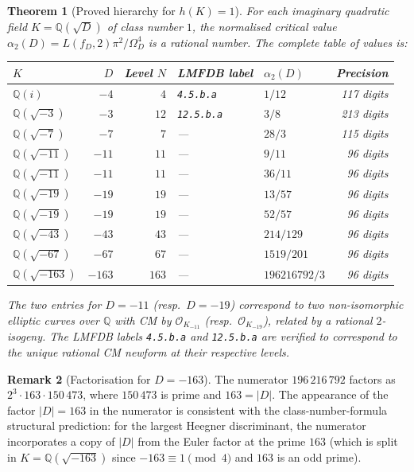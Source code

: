 \documentclass[12pt]{amsart}
\newtheorem{theorem}{Theorem}[section]
\theoremstyle{definition}
\newtheorem{remark}[theorem]{Remark}
\newcommand{\Q}{\mathbb{Q}}
\newcommand{\OK}{\mathcal{O}_K}
\newcommand{\Omega}{\varOmega}
\begin{document}
\begin{theorem}[Proved hierarchy for $h(K)=1$]
  \label{thm:hierarchy}
  For each imaginary quadratic field $K = \Q(\sqrt{D})$ of class number $1$,
  the normalised critical value $\alpha_2(D) = L(f_D,2)\pi^2/\Omega_D^4$
  is a rational number. The complete table of values is:

  \begin{center}
  \renewcommand{\arraystretch}{1.35}
  \begin{tabular}{lrrllr}
    \toprule
    $K$ & $D$ & Level $N$ & LMFDB label & $\alpha_2(D)$ & Precision \\
    \midrule
    $\Q(i)$         & $-4$   & $4$   & \texttt{4.5.b.a}  & $1/12$          & 117 digits \\
    $\Q(\sqrt{-3})$ & $-3$   & $12$  & \texttt{12.5.b.a} & $3/8$           & 213 digits \\
    $\Q(\sqrt{-7})$ & $-7$   & $7$   & ---               & $28/3$          & 115 digits \\
    $\Q(\sqrt{-11})$& $-11$  & $11$  & ---               & $9/11$          &  96 digits \\
    $\Q(\sqrt{-11})$& $-11$  & $11$  & ---               & $36/11$         &  96 digits \\
    $\Q(\sqrt{-19})$& $-19$  & $19$  & ---               & $13/57$         &  96 digits \\
    $\Q(\sqrt{-19})$& $-19$  & $19$  & ---               & $52/57$         &  96 digits \\
    $\Q(\sqrt{-43})$& $-43$  & $43$  & ---               & $214/129$       &  96 digits \\
    $\Q(\sqrt{-67})$& $-67$  & $67$  & ---               & $1519/201$      &  96 digits \\
    $\Q(\sqrt{-163})$& $-163$ & $163$ & ---              & $196216792/3$   &  96 digits \\
    \bottomrule
  \end{tabular}
  \end{center}

  The two entries for $D = -11$ (resp.\ $D = -19$) correspond to two
  non-isomorphic elliptic curves over $\Q$ with CM by $\OK_{-11}$
  (resp.\ $\OK_{-19}$), related by a rational $2$-isogeny.
  The LMFDB labels \texttt{4.5.b.a} and \texttt{12.5.b.a} are verified to
  correspond to the unique rational CM newform at their respective levels.
\end{theorem}

\begin{remark}[Factorisation for $D = -163$]
  The numerator $196\,216\,792$ factors as $2^3 \cdot 163 \cdot 150\,473$,
  where $150\,473$ is prime and $163 = |D|$.
  The appearance of the factor $|D| = 163$ in the numerator is consistent
  with the class-number-formula structural prediction: for the largest
  Heegner discriminant, the numerator incorporates a copy of $|D|$ from the
  Euler factor at the prime $163$ (which is split in $K = \Q(\sqrt{-163})$
  since $-163 \equiv 1 \pmod{4}$ and $163$ is an odd prime).
\end{remark}
\end{document}

